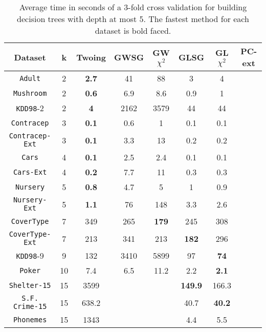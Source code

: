 \begin{table*}[]
\small
\centering
\caption{Average time in seconds of a 3-fold cross validation
for building decision trees with depth at most 5.
The fastest method for each dataset is bold faced.}
\begin{tabular}{c|c|c|c|c|c|c|c}
Dataset             & k  & Twoing    & GWSG  & GW$\chi^2$ & GLSG      & GL$\chi^2$ & PC-ext     \\ \hline
{\tt Adult}         & 2  & {\bf  2.7} & 41   & 88         & 3         & 4          &            \\
{\tt Mushroom}      & 2  & {\bf 0.6} & 6.9  & 8.6         & 0.9       & 1          &            \\
{\tt KDD98}-2       & 2  & {\bf 4}   & 2162 & 3579        & 44        & 44         &            \\
{\tt Contracep}     & 3  & {\bf 0.1} & 0.6  & 1           & 0.1       & 0.1        &            \\
{\tt Contracep-Ext} & 3  & {\bf 0.1} & 3.3  & 13          & 0.2       & 0.2        &            \\
{\tt Cars}          & 4  & {\bf 0.1} & 2.5  & 2.4         & 0.1       & 0.1        &            \\
{\tt Cars-Ext}      & 4  & {\bf 0.2} & 7.7  & 11          & 0.3       & 0.3        &            \\
{\tt Nursery}       & 5  & {\bf 0.8} & 4.7  & 5           & 1         & 0.9        &            \\
{\tt Nursery-Ext}   & 5  & {\bf 1.1} & 76   & 148         & 3.3       & 2.6        &            \\
{\tt CoverType}     & 7  & 349       & 265  & {\bf 179}   & 245       & 308        &            \\
{\tt CoverType-Ext} & 7  & 213       & 341  & 213         & {\bf 182} & 296        &            \\
{\tt KDD98}-9       & 9  & 132       & 3410 & 5899        & 97        & {\bf 74}   &            \\ 
{\tt Poker}         & 10 & 7.4       & 6.5  & 11.2        & 2.2       & {\bf 2.1}  &            \\
{\tt Shelter-15}    & 15 & 3599      &      &             & {\bf149.9}& 166.3      &            \\   
{\tt S.F. Crime-15} & 15 & 638.2     &      &             & 40.7      & {\bf 40.2} &            \\ 
{\tt Phonemes}      & 15 & 1343      &      &             &      4.4  & 5.5        &       
\end{tabular}
\label{tab:time}
\end{table*}



